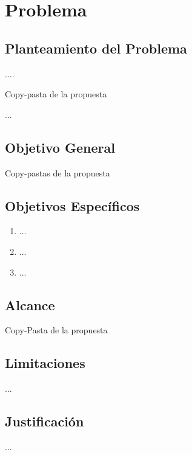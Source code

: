 \chapter{Problema}
\label{chap:problema}


\section{Planteamiento del Problema }

....

Copy-pasta de la propuesta

...


\section{Objetivo General }

Copy-pastas de la propuesta

\section{Objetivos Espec\'ificos }

\begin{enumerate}
	\item ...
	\item ...
	\item ...
\end{enumerate}


\section{Alcance }

Copy-Pasta de la propuesta


\section{Limitaciones }
...

\section{Justificaci\'on }

...
